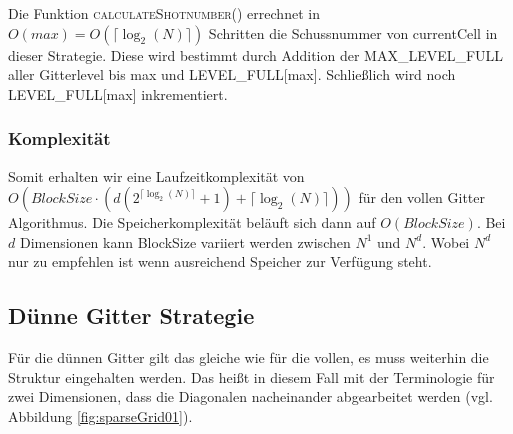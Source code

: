 \documentclass[a4paper,12pt]{llncs}
\numberwithin{equation}{section}
\begin{document}
Die Funktion \textsc{calculateShotnumber}() errechnet in $O(max) = O\left(\lceil\log_2(N)\rceil\right)$ Schritten die Schussnummer von currentCell in dieser Strategie. Diese wird bestimmt durch Addition der MAX\_LEVEL\_FULL aller Gitterlevel bis max und LEVEL\_FULL[max]. Schließlich wird noch LEVEL\_FULL[max] inkrementiert.

\subsubsection{Komplexität}
Somit erhalten wir eine Laufzeitkomplexität von \\ $O\left(BlockSize\cdot\left(d\left( 2^{\lceil\log_2(N)\rceil}+1\right)+\lceil\log_2(N)\rceil\right)\right)$ für den vollen Gitter Algorithmus. Die Speicherkomplexität beläuft sich dann auf $O(BlockSize)$. Bei $d$ Dimensionen kann BlockSize variiert werden zwischen $N^1$ und $N^d$. Wobei $N^d$ nur zu empfehlen ist wenn ausreichend Speicher zur Verfügung steht. 

\subsection{Dünne Gitter Strategie}

Für die dünnen Gitter gilt das gleiche wie für die vollen, es muss weiterhin die Struktur eingehalten werden. Das heißt in diesem Fall mit der Terminologie für zwei Dimensionen, dass die Diagonalen nacheinander abgearbeitet werden (vgl. Abbildung \ref{fig:sparseGrid01}).
\end{document}
